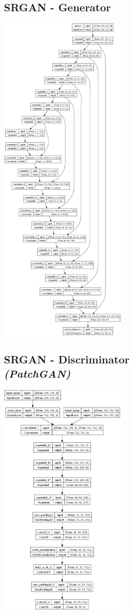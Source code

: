 \documentclass{article}
\begin{document}
\begin{multicols}{2}
\subsection{SRGAN - Generator \vspace{1.25\baselineskip}}
    \includegraphics[width=0.475\textwidth]{../imgs/srgan_generator.png}
\subsection{SRGAN - Discriminator \\ \textit{(PatchGAN)}}
    \includegraphics[width=0.475\textwidth]{../imgs/srgan_discriminator.png}
\end{multicols}
\end{document}
